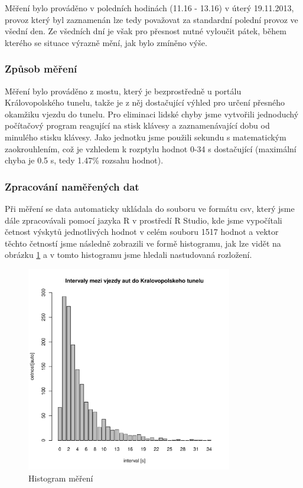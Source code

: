 \documentclass[12pt,a4paper]{article}
\begin{document}
		Měření bylo prováděno v poledních hodinách (11.16 - 13.16) v úterý 19.11.2013, provoz který byl
		zaznamenán lze tedy považovat za standardní polední provoz ve všední den. Ze všedních dní je však 
		pro přesnost nutné vyloučit pátek, během kterého se situace výrazně mění, jak bylo zmíněno výše.

		\subsubsection{Způsob měření}
		Měření bylo prováděno z mostu, který je bezprostředně u portálu Královopolského tunelu, takže je z 
		něj dostačující výhled pro určení přesného okamžiku vjezdu do tunelu. Pro eliminaci lidské chyby 
		jsme vytvořili jednoduchý počítačový program reagující na stisk klávesy a zaznamenávající dobu od
		minulého stisku klávesy. Jako jednotku jsme použili sekundu s matematickým zaokrouhlením, což je 
		vzhledem k rozptylu hodnot 0-34 s dostačující (maximální chyba je 0.5 s, tedy 1.47\% rozsahu hodnot).

		\subsubsection{Zpracování naměřených dat}
		Při měření se data automaticky ukládala do souboru ve formátu csv, který jsme dále zpracovávali
		pomocí jazyka R v prostředí R Studio, kde jsme vypočítali četnost výskytů jednotlivých hodnot v
		celém souboru 1517 hodnot a vektor těchto četností jsme následně zobrazili ve formě histogramu, jak 
		lze vidět na obrázku \ref{tunel} a v tomto histogramu jsme hledali nastudovaná rozložení.

		\begin{figure}[ht!]
		\centering
		\includegraphics[width=90mm]{../measuring/tunelBarPlot.pdf}
		\caption{Histogram měření}
		\label{tunel}
		\end{figure}
\end{document}
